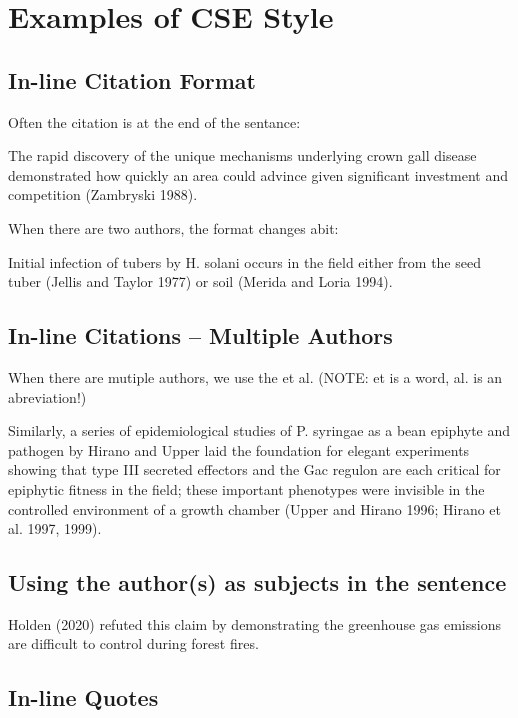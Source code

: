 \documentclass{article}\usepackage[]{graphicx}\usepackage[]{color}
\begin{document}
\clearpage

\section{Examples of CSE Style}

\subsection{In-line Citation Format}

\noindent Often the citation is at the end of the sentance: 

The rapid discovery of the unique mechanisms underlying crown gall disease demonstrated how quickly an area could advince given significant investment and competition (Zambryski 1988).

\noindent When there are two authors, the format changes abit: 

Initial infection of tubers by H. solani occurs in the field either from the seed tuber (Jellis and Taylor 1977) or soil (Merida and Loria 1994).

\subsection{In-line Citations -- Multiple Authors}

\noindent When there are mutiple authors, we use the et al. (NOTE: et is a word, al. is an abreviation!)

Similarly, a series of epidemiological studies of P. syringae as a bean epiphyte and pathogen by Hirano and Upper laid the foundation for elegant experiments showing that type III secreted effectors and the Gac regulon are each critical for epiphytic fitness in the field; these important phenotypes were invisible in the controlled environment of a growth chamber (Upper and Hirano 1996; Hirano et al. 1997, 1999).

\subsection{Using the author(s) as subjects in the sentence}

Holden (2020) refuted this claim by demonstrating the greenhouse gas emissions are difficult to control during forest fires.

\subsection{In-line Quotes}
\end{document}
